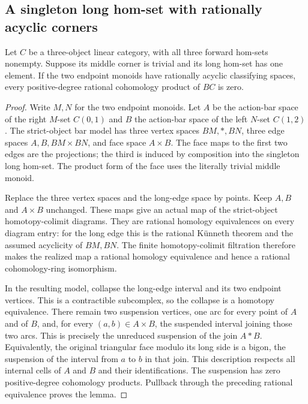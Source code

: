 \subsection{A singleton long hom-set with rationally acyclic corners}

\begin{lemma}\label{C:singleton-long-trivial-middle-suspension}
Let $C$ be a three-object linear category, with all three
forward hom-sets nonempty.  Suppose its middle
corner is trivial and its long hom-set has one element.
If the two endpoint monoids have rationally acyclic
classifying spaces, every positive-degree rational cohomology
product of $BC$ is zero.
\end{lemma}
\begin{proof}
Write $M,N$ for the two endpoint monoids.  Let $A$ be the
action-bar space of the right $M$-set $C(0,1)$ and $B$ the
action-bar space of the left $N$-set $C(1,2)$.  The strict-object
bar model has three vertex spaces $BM,*,BN$, three edge
spaces $A,B,BM\times BN$, and face space $A\times B$.
The face maps to the first two edges are the projections;
the third is induced by composition into the singleton long
hom-set.  The product form of the face uses the literally
trivial middle monoid.

Replace the three vertex spaces and the long-edge space by
points.  Keep $A,B$ and $A\times B$ unchanged.  These maps
give an actual map of the strict-object homotopy-colimit
diagrams.  They are rational homology equivalences on every
diagram entry: for the long edge this is the rational
K\"unneth theorem and the assumed acyclicity of $BM,BN$.
The finite homotopy-colimit filtration therefore makes the
realized map a rational homology equivalence and hence a
rational cohomology-ring isomorphism.

In the resulting model, collapse the long-edge interval
and its two endpoint vertices.  This is a contractible
subcomplex, so the collapse is a homotopy equivalence.
There remain two suspension vertices, one arc for every
point of $A$ and of $B$, and, for every $(a,b)\in A\times B$,
the suspended interval joining those two arcs.  This is
precisely the unreduced suspension of the join $A*B$.
Equivalently, the original triangular face modulo its
long side is a bigon, the suspension of the interval
from $a$ to $b$ in that join.  This description respects
all internal cells of $A$ and $B$ and their identifications.
The suspension has zero positive-degree cohomology
products.  Pullback through the preceding rational
equivalence proves the lemma.
\end{proof}

